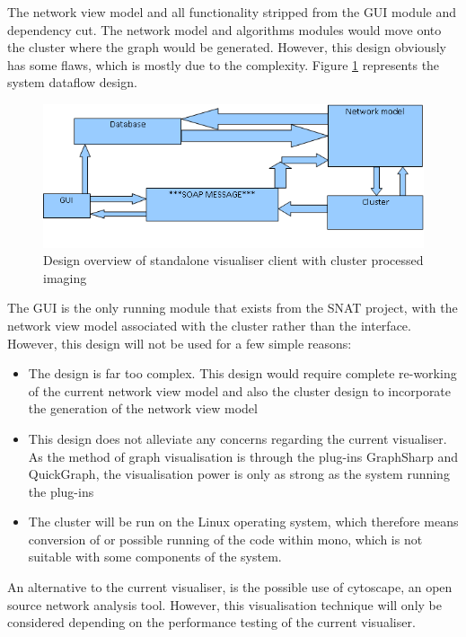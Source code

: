 The network view model and all functionality stripped from the GUI module and dependency cut. The network model and algorithms modules would move onto the cluster where the graph would be generated. However, this design obviously has some flaws, which is mostly due to the complexity. Figure \ref{fig:des2} represents the system dataflow design.

\begin{figure}%
\centering
\includegraphics[width=0.6\columnwidth]{./img/des2}%
\caption{Design overview of standalone visualiser client with cluster processed imaging}%
\label{fig:des2}%
\end{figure}

The GUI is the only running module that exists from the SNAT project, with the network view model associated with the cluster rather than the interface. However, this design will not be used for a few simple reasons:

\begin{itemize}
	\item The design is far too complex. This design would require complete re-working of the current network view model and also the cluster design to incorporate the generation of the network view model
	
	\item This design does not alleviate any concerns regarding the current visualiser. As the method of graph visualisation is through the plug-ins GraphSharp and QuickGraph, the visualisation power is only as strong as the system running the plug-ins
	
	\item The cluster will be run on the Linux operating system, which therefore means conversion of or possible running of the code within mono, which is not suitable with some components of the system.
\end{itemize}

An alternative to the current visualiser, is the possible use of cytoscape, an open source network analysis tool. However, this visualisation technique will only be considered depending on the performance testing of the current visualiser.
